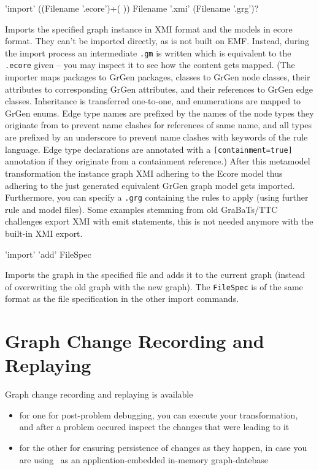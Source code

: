 \begin{rail}
  'import' ((Filename '.ecore')+( )) Filename '.xmi' (Filename '.grg')?
\end{rail}\label{shellecoreexport}
Imports the specified graph instance in XMI format and the models in ecore format.
They can't be imported directly, as \GrG{ } is not built on EMF.
Instead, during the import process an intermediate \texttt{.gm} is written which is equivalent to the \texttt{.ecore} given -- you may inspect it to see how the content gets mapped.
(The importer maps packages to GrGen packages, classes to GrGen node classes, their attributes to corresponding GrGen attributes, and their references to GrGen edge classes.
Inheritance is transferred one-to-one, and enumerations are mapped to GrGen enums.
Edge type names are prefixed by the names of the node types they originate from to prevent name clashes for references of same name,
and all types are prefixed by an underscore to prevent name clashes with keywords of the rule language.
Edge type declarations are annotated with a \verb#[containment=true]# annotation if they originate from a containment reference.)
After this metamodel transformation the instance graph XMI adhering to the Ecore model thus adhering to the just
generated equivalent GrGen graph model gets imported.
Furthermore, you can specify a \texttt{.grg} containing the rules to apply (using further rule and model files).
Some examples stemming from old GraBaTs/TTC challenges export XMI with emit statements, this is not needed anymore with the built-in XMI export.

\begin{rail}
  'import' 'add' FileSpec
\end{rail}
Imports the graph in the specified file and adds it to the current graph
(instead of overwriting the old graph with the new graph).
The \texttt{FileSpec} is of the same format as the file specification in the other import commands.


\section{Graph Change Recording and Replaying}
\label{recordnreplay}

Graph change recording and replaying is available 
\begin{itemize}
	\item for one for post-problem debugging, you can execute your transformation, and after a problem occured inspect the changes that were leading to it
	\item for the other for ensuring persistence of changes as they happen, in case you are using \GrG\ as an application-embedded in-memory graph-datebase
\end{itemize}

